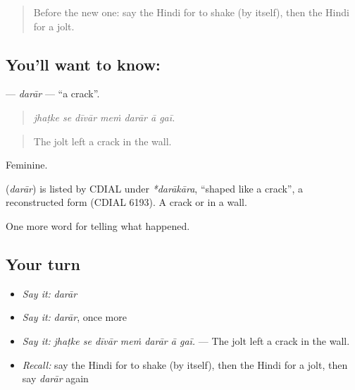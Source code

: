 \label{lesson:HI-C303-darar}



\begin{quote}
Before the new one: say the Hindi for to shake (by itself), then the Hindi for a jolt.
\end{quote}

\subsection*{You'll want to know: }
\textbf{} — \emph{darār} — \textquotedblleft{}a crack\textquotedblright{}.

\begin{quote}
      
\end{quote}

\begin{quote}
\emph{jhaṭke se dīvār meṁ darār ā gaī.}
\end{quote}

\begin{quote}
The jolt left a crack in the wall.
\end{quote}

Feminine.

\begin{cousinweb}
\textbf{} (\emph{darār}) is listed by CDIAL under \emph{*darākāra}, \textquotedblleft{}shaped like a crack\textquotedblright{}, a reconstructed form (CDIAL 6193). A crack \textbf{ } or \textbf{ } in a wall.
\end{cousinweb}

\begin{grammarlens}[title={What you've built}]
One more word for telling what happened.
\end{grammarlens}

\subsection*{Your turn}
\begin{itemize}
\raggedright
  \item \emph{Say it:} \emph{darār}
  \item \emph{Say it:} \emph{darār}, once more
  \item \emph{Say it:} \emph{jhaṭke se dīvār meṁ darār ā gaī.} — The jolt left a crack in the wall.
  \item \emph{Recall:} say the Hindi for to shake (by itself), then the Hindi for a jolt, then say \emph{darār} again
\end{itemize}

